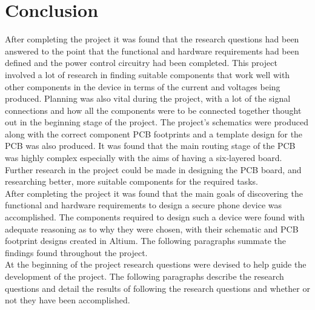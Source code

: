 
\chapter{Conclusion} %

\label{Chapter8} %

	After completing the project it was found that the research questions had been answered to the point that the functional and hardware requirements had been defined and the power control circuitry had been completed. This project involved a lot of research in finding suitable components that work well with other components in the device in terms of the current and voltages being produced. Planning was also vital during the project, with a lot of the signal connections and how all the components were to be connected together thought out in the beginning stage of the project. The project's schematics were produced along with the correct component PCB footprints and a template design for the PCB was also produced. It was found that the main routing stage of the PCB was highly complex especially with the aims of having a six-layered board. \\
	Further research in the project could be made in designing the PCB board, and researching better, more suitable components for the required tasks. \\

	After completing the project it was found that the main goals of discovering the functional and hardware requirements to design a secure phone device was accomplished. The components required to design such a device were found with adequate reasoning as to why they were chosen, with their schematic and PCB footprint designs created in Altium. The following paragraphs summate the findings found throughout the project.\\

	At the beginning of the project research questions were devised to help guide the development of the project. The following paragraphs describe the research questions and detail the results of following the research questions and whether or not they have been accomplished.\\

